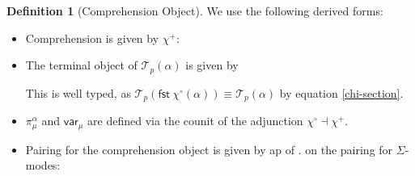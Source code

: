 \documentclass[10pt]{article}
\theoremstyle{definition}
\newtheorem{definition}{Definition}
\newcommand\dsd[1]{\ensuremath{\mathsf{#1}}}
\newcommand{\yields}{\vdash}
\newcommand\TermTwoT[5]{\ensuremath{#1 \mid #3 \vDash_{#5} #2 : #4}}
\newcommand\TrPlus[2]{\ensuremath{{#1}^+(#2)}}
\newcommand\TrCirc[2]{\ensuremath{{#1}^\circ(#2)}}
\newcommand\var[1]{\ensuremath{\mathsf{var}_{#1}}}
\newcommand\El[2]{\mathcal{T}_{#1}(#2)}
\newcommand\ApEl[2]{\mathcal{T}_{#1}\langle#2\rangle}
\newcommand\ap[2]{\ensuremath{#1 \langle #2 \rangle }}
\newcommand{\app}[2]{\ensuremath{#1 \: #2}}
\newcommand{\sigmacl}[3]{\ensuremath{\textnormal{$\Sigma$}\,#1{:}#2.\,#3}}
\newcommand{\fst}[1]{\app{\dsd{fst}}{#1}}
\newcommand{\snd}[1]{\app{\dsd{snd}}{#1}}
\newcommand\bdot[0]{\mathbin{.}}
\begin{document}
\begin{definition}[Comprehension Object]
\noindent We use the following derived forms:
  \begin{itemize}
  \item Comprehension is given by $\chi^+$:
  \item The terminal object of $\El{p}{\alpha}$ is given by 
  This is well typed, as $\El{p}{\fst{\TrCirc{\chi}{\alpha}}} \equiv \El{p}{\alpha}$ by equation \eqref{chi-section}.
  \item $\pi^\alpha_\mu$ and $\var{\mu}$ are defined via the counit of the adjunction $\chi^\circ \dashv \chi^+$.
  \item Pairing for the comprehension object is given by ap of
  $.$ on the pairing for $\Sigma$-modes:
  \end{itemize}
\end{definition}
\end{document}
